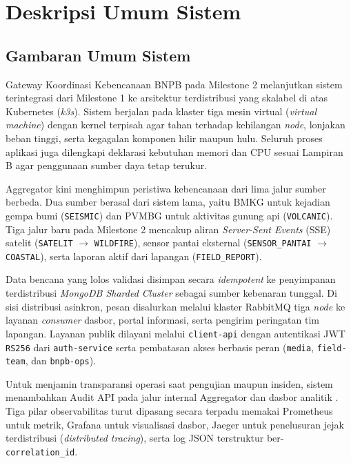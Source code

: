 \section{Deskripsi Umum Sistem}

\subsection{Gambaran Umum Sistem}

Gateway Koordinasi Kebencanaan BNPB pada Milestone 2 melanjutkan sistem terintegrasi dari Milestone 1 ke arsitektur terdistribusi yang skalabel di atas Kubernetes (\textit{k3s}). Sistem berjalan pada klaster tiga mesin virtual (\textit{virtual machine}) dengan kernel terpisah agar tahan terhadap kehilangan \textit{node}, lonjakan beban tinggi, serta kegagalan komponen hilir maupun hulu. Seluruh proses aplikasi juga dilengkapi deklarasi kebutuhan memori dan CPU sesuai Lampiran B agar penggunaan sumber daya tetap terukur.

Aggregator kini menghimpun peristiwa kebencanaan dari lima jalur sumber berbeda. Dua sumber berasal dari sistem lama, yaitu BMKG untuk kejadian gempa bumi (\texttt{SEISMIC}) dan PVMBG untuk aktivitas gunung api (\texttt{VOLCANIC}). Tiga jalur baru pada Milestone 2 mencakup aliran \textit{Server-Sent Events} (SSE) satelit (\texttt{SATELIT} $\to$ \texttt{WILDFIRE}), sensor pantai eksternal (\texttt{SENSOR\_PANTAI} $\to$ \texttt{COASTAL}), serta laporan aktif dari lapangan (\texttt{FIELD\_REPORT}).

Data bencana yang lolos validasi disimpan secara \textit{idempotent} ke penyimpanan terdistribusi \textit{MongoDB Sharded Cluster} sebagai sumber kebenaran tunggal. Di sisi distribusi asinkron, pesan disalurkan melalui klaster RabbitMQ tiga \textit{node} ke layanan \textit{consumer} dasbor, portal informasi, serta pengirim peringatan tim lapangan. Layanan publik dilayani melalui \texttt{client-api} dengan autentikasi JWT \texttt{RS256} dari \texttt{auth-service} serta pembatasan akses berbasis peran (\texttt{media}, \texttt{field-team}, dan \texttt{bnpb-ops}).

Untuk menjamin transparansi operasi saat pengujian maupun insiden, sistem menambahkan Audit API pada jalur internal Aggregator dan dasbor analitik . Tiga pilar observabilitas turut dipasang secara terpadu memakai Prometheus untuk metrik, Grafana untuk visualisasi dasbor, Jaeger untuk penelusuran jejak terdistribusi (\textit{distributed tracing}), serta log JSON terstruktur ber-\texttt{correlation\_id}.

